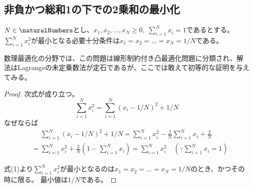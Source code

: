         \subsection{非負かつ総和1の下での2乗和の最小化}
            \label{非負かつ総和1の下での2乗和の最小化}
            \begin{shadebox}
                $N\in\naturalNumbers$とし、$x_1,x_2,\dots,x_N \geq 0,\;\sum_{i=1}^N x_i = 1$であるとする。
                $\sum_{i=1}^N x_i^2$が最小となる必要十分条件は$x_1 = x_2 = \dots = x_N = 1/N$である。
            \end{shadebox}
            数理最適化の分野では、この問題は線形制約付き凸最適化問題に分類され、解法はLagrangeの未定乗数法が定石であるが、ここでは敢えて初等的な証明を与えてみる。
            \begin{proof}
                \quad\par
                次式が成り立つ。
                \[ \sum_{i=1}^N x_i^2 = \sum_{i=1}^N (x_i - 1/N)^2 + 1/N \tag{1} \]
                なぜならば
                \begin{align*}
                    &\phantom{=} \sum_{i=1}^N (x_i - 1/N)^2 + 1/N = \sum_{i=1}^N x_i^2 - \frac{2}{N}\sum_{i=1}^N x_i + \frac{2}{N} \\
                    &= \sum_{i=1}^N x_i^2 + \frac{2}{N}\left(1 - \sum_{i=1}^N x_i\right) = \sum_{i=1}^N x_i^2 \quad \left(\because \sum_{i=1}^N x_i = 1\right)
                \end{align*}
                \par
                式(1)より$\sum_{i=1}^N x_i^2$が最小となるのは$x_1 = x_2 = \dots = x_N = 1/N$のとき、かつその時に限る。
                最小値は$1/N$である。
            \end{proof}
